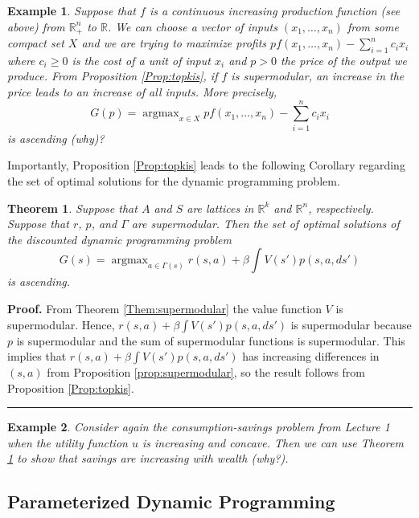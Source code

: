 \documentclass[letter,11pt]{article}
\newtheorem{theorem}{Theorem}[section]
\newtheorem{example}{Example}[section]
\newenvironment {proof}[1][Proof]{\noindent \textbf {#1.} }{\ \rule {0.5em}{0.5em}}
\begin{document}
\begin{example}
    Suppose that $f$ is a continuous increasing production function (see above) from $\mathbb{R}^{n}_{+}$ to $\mathbb{R}$. We can choose a vector of inputs $(x_{1},\ldots,x_{n})$ from some compact set $X$ and we are trying to maximize profits $pf(x_{1},\ldots,x_{n})-\sum _{i=1}^{n} c_{i} x_{i}$ where $c_{i} \geq 0$ is the cost of a unit of input $x_{i}$ and $p>0$ the price of the output we produce. From Proposition \ref{Prop:topkis}, if $f$ is supermodular, an increase in the price leads to an increase of all inputs. More precisely, $$G(p) = \operatorname{argmax}_{x \in X}pf(x_{1},\ldots,x_{n})-\sum _{i=1}^{n} c_{i} x_{i}$$     
is ascending (why)? 
\end{example}

Importantly, Proposition \ref{Prop:topkis} leads to the following Corollary regarding the set of optimal solutions for the dynamic programming problem.  

\begin{theorem} \label{Thm:Optimal Solutions}
    Suppose that $A$ and $S$ are lattices in $\mathbb{R}^{k}$ and $\mathbb{R}^{n}$, respectively. Suppose that $r$, $p$, and $\Gamma$   are supermodular. 
    Then the set of optimal solutions of the discounted dynamic programming problem 
    $$G(s) = \operatorname{argmax} _{a \in \Gamma(s)} r(s,a) + \beta \int V(s')p(s,a,ds')$$
    is ascending. 
\end{theorem}

  \begin{proof}
      From Theorem \ref{Them:supermodular} the value function $V$ is supermodular. Hence, 
      $r(s,a) + \beta \int V(s')p(s,a,ds') $ is supermodular because $p$ is supermodular and  the sum of supermodular functions is supermodular. This implies that  $r(s,a) + \beta \int V(s')p(s,a,ds') $ has increasing differences in $(s,a)$ from Proposition \ref{prop:supermodular}, so the result follows from Proposition \ref{Prop:topkis}.
      \end{proof}


\begin{example}
    Consider again the consumption-savings problem from Lecture 1 when the utility function $u$ is  increasing and concave. Then we can use Theorem \ref{Thm:Optimal Solutions} to show that savings are increasing with wealth (why?). 
\end{example}


\subsection{Parameterized Dynamic Programming}
\end{document}
